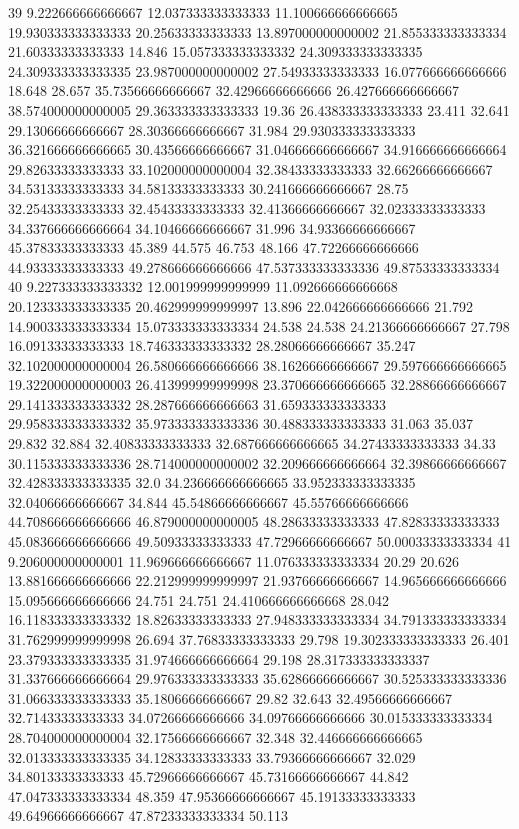 39 9.222666666666667 12.037333333333333 11.100666666666665 19.930333333333333 20.25633333333333 13.897000000000002 21.855333333333334 21.60333333333333 14.846 15.057333333333332 24.309333333333335 24.309333333333335 23.987000000000002 27.54933333333333 16.077666666666666 18.648 28.657 35.73566666666667 32.42966666666666 26.427666666666667 38.574000000000005 29.363333333333333 19.36 26.438333333333333 23.411 32.641 29.13066666666667 28.30366666666667 31.984 29.930333333333333 36.321666666666665 30.43566666666667 31.046666666666667 34.916666666666664 29.82633333333333 33.102000000000004 32.38433333333333 32.66266666666667 34.53133333333333 34.58133333333333 30.241666666666667 28.75 32.25433333333333 32.45433333333333 32.41366666666667 32.02333333333333 34.337666666666664 34.10466666666667 31.996 34.93366666666667 45.37833333333333 45.389 44.575 46.753 48.166 47.72266666666666 44.93333333333333 49.278666666666666 47.537333333333336 49.87533333333334
40 9.227333333333332 12.001999999999999 11.092666666666668 20.123333333333335 20.462999999999997 13.896 22.042666666666666 21.792 14.900333333333334 15.073333333333334 24.538 24.538 24.21366666666667 27.798 16.09133333333333 18.746333333333332 28.28066666666667 35.247 32.102000000000004 26.580666666666666 38.16266666666667 29.597666666666665 19.322000000000003 26.413999999999998 23.370666666666665 32.28866666666667 29.141333333333332 28.287666666666663 31.659333333333333 29.958333333333332 35.973333333333336 30.488333333333333 31.063 35.037 29.832 32.884 32.40833333333333 32.687666666666665 34.27433333333333 34.33 30.115333333333336 28.714000000000002 32.209666666666664 32.39866666666667 32.428333333333335 32.0 34.236666666666665 33.952333333333335 32.04066666666667 34.844 45.54866666666667 45.55766666666666 44.708666666666666 46.879000000000005 48.28633333333333 47.82833333333333 45.083666666666666 49.50933333333333 47.72966666666667 50.00033333333334
41 9.206000000000001 11.969666666666667 11.076333333333334 20.29 20.626 13.881666666666666 22.212999999999997 21.93766666666667 14.965666666666666 15.095666666666666 24.751 24.751 24.410666666666668 28.042 16.118333333333332 18.82633333333333 27.948333333333334 34.791333333333334 31.762999999999998 26.694 37.76833333333333 29.798 19.302333333333333 26.401 23.379333333333335 31.974666666666664 29.198 28.317333333333337 31.337666666666664 29.976333333333333 35.62866666666667 30.525333333333336 31.066333333333333 35.18066666666667 29.82 32.643 32.49566666666667 32.71433333333333 34.07266666666666 34.09766666666666 30.015333333333334 28.704000000000004 32.17566666666667 32.348 32.446666666666665 32.013333333333335 34.12833333333333 33.79366666666667 32.029 34.80133333333333 45.72966666666667 45.73166666666667 44.842 47.047333333333334 48.359 47.95366666666667 45.19133333333333 49.64966666666667 47.87233333333334 50.113
